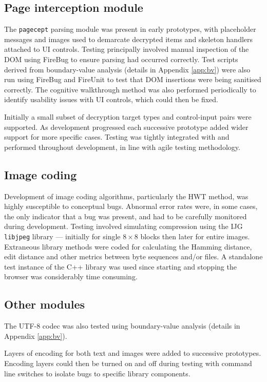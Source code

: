 \subsection{Page interception module}

The {\tt pagecept} parsing module was present in early prototypes, with placeholder messages and images used to demarcate decrypted items and skeleton handlers attached to UI controls. Testing principally involved manual inspection of the DOM using FireBug to ensure parsing had occurred correctly. Test scripts derived from boundary-value analysis (details in Appendix \ref{app:bv}) were also run using FireBug and FireUnit to test that DOM insertions were being sanitised correctly. The cognitive walkthrough method was also performed periodically to identify usability issues with UI controls, which could then be fixed.

Initially a small subset of decryption target types and control-input pairs were supported. As development progressed each successive prototype added wider support for more specific cases. Testing was tightly integrated with and performed throughout development, in line with agile testing methodology.


\subsection{Image coding}

Development of image coding algorithms, particularly the HWT method, was highly susceptible to conceptual bugs. Abnormal error rates were, in some cases, the only indicator that a bug was present, and had to be carefully monitored during development. Testing involved simulating compression using the IJG {\tt libjpeg} library --- initially for single $8 \times 8$ blocks then later for entire images. Extraneous library methods were coded for calculating the Hamming distance, edit distance and other metrics between byte sequences and/or files. A standalone test instance of the C++ library was used since starting and stopping the browser was considerably time consuming.


\subsection{Other modules}

The UTF-8 codec was also tested using boundary-value analysis (details in Appendix \ref{app:bv}). 

Layers of encoding for both text and images were added to successive prototypes. Encoding layers could then be turned on and off during testing with command line switches to isolate bugs to specific library components.


